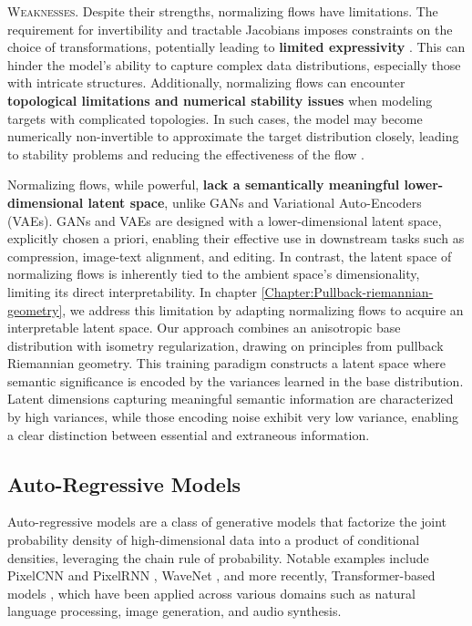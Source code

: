 \textsc{Weaknesses.} Despite their strengths, normalizing flows have limitations. The requirement for invertibility and tractable Jacobians imposes constraints on the choice of transformations, potentially leading to \textbf{limited expressivity} \cite{papamakarios2019normalizing}. This can hinder the model's ability to capture complex data distributions, especially those with intricate structures. Additionally, normalizing flows can encounter \textbf{topological limitations and numerical stability issues} when modeling targets with complicated topologies. In such cases, the model may become numerically non-invertible to approximate the target distribution closely, leading to stability problems and reducing the effectiveness of the flow \cite{behrmann2021understanding, cornish2020relaxing}. 

Normalizing flows, while powerful, \textbf{lack a semantically meaningful lower-dimensional latent space}, unlike GANs and Variational Auto-Encoders (VAEs). GANs and VAEs are designed with a lower-dimensional latent space, explicitly chosen a priori, enabling their effective use in downstream tasks such as compression, image-text alignment, and editing. In contrast, the latent space of normalizing flows is inherently tied to the ambient space's dimensionality, limiting its direct interpretability. In chapter \ref{Chapter:Pullback-riemannian-geometry}, we address this limitation by adapting normalizing flows to acquire an interpretable latent space. Our approach combines an anisotropic base distribution with isometry regularization, drawing on principles from pullback Riemannian geometry. This training paradigm constructs a latent space where semantic significance is encoded by the variances learned in the base distribution. Latent dimensions capturing meaningful semantic information are characterized by high variances, while those encoding noise exhibit very low variance, enabling a clear distinction between essential and extraneous information.

\subsection{Auto-Regressive Models}\label{sec:auto_regressive_models}

Auto-regressive models are a class of generative models that factorize the joint probability density of high-dimensional data into a product of conditional densities, leveraging the chain rule of probability. Notable examples include PixelCNN and PixelRNN \cite{oord2016pixel}, WaveNet \cite{vanwavenet2016}, and more recently, Transformer-based models \cite{vaswani2017attention}, which have been applied across various domains such as natural language processing, image generation, and audio synthesis.

